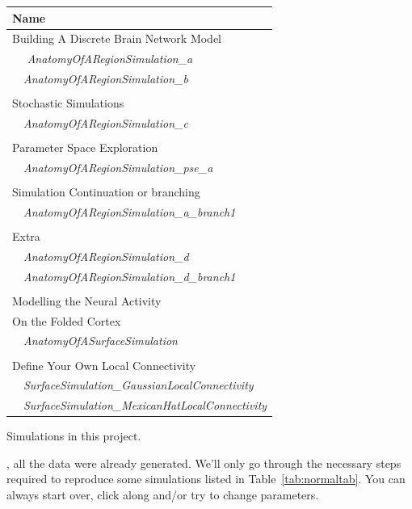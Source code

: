 \documentclass{tufte-handout}
\begin{document}
\begin{margintable}
  \centering
  \selectfont
  \begin{tabular}{l}
    \toprule
    Name \\
    \midrule
    \multicolumn{1}{l}{Building A Discrete Brain Network Model }\\
    $\quad$ \textit{AnatomyOfARegionSimulation\_a} \\
    $\quad$\textit{AnatomyOfARegionSimulation\_b}  \\ 
    \\
    \multicolumn{1}{l}{Stochastic Simulations}\\
     $\quad$\textit{AnatomyOfARegionSimulation\_c}  \\
    \\
    \multicolumn{1}{l}{Parameter Space Exploration}\\
     $\quad$\textit{AnatomyOfARegionSimulation\_pse\_a} \\
    \\
    \multicolumn{1}{l}{Simulation Continuation or branching}\\
     $\quad$\textit{AnatomyOfARegionSimulation\_a\_branch1} \\
    \\
    \multicolumn{1}{l}{Extra}\\
     $\quad$\textit{AnatomyOfARegionSimulation\_d}  \\ 
     $\quad$\textit{AnatomyOfARegionSimulation\_d\_branch1}  \\ 
    \\
     \multicolumn{1}{l}{Modelling the Neural Activity}\\
     \multicolumn{1}{l}{On the Folded Cortex}\\
    $\quad$\textit{AnatomyOfASurfaceSimulation} \\
    \\
    \multicolumn{1}{l}{Define Your Own Local Connectivity}\\
      $\quad$\textit{SurfaceSimulation\_GaussianLocalConnectivity} \\
      $\quad$\textit{SurfaceSimulation\_MexicanHatLocalConnectivity}\\
    \bottomrule
  \end{tabular}
  \caption{Simulations in this project.}
  \label{tab:normaltab}
\end{margintable}


, all the data were already generated. We'll only go through the necessary steps required to reproduce some simulations listed in Table~\ref{tab:normaltab}. You can always start over, click along and/or try to change parameters.
\end{document}
